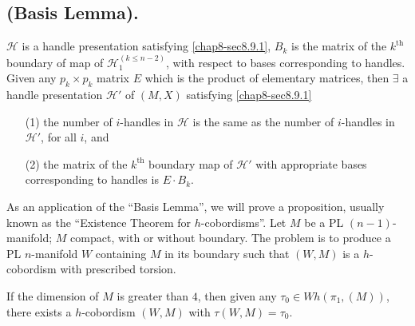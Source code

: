 \subsection{(Basis Lemma).}\label{chap8-sec8.9.2}
$\mathscr{H}$ is a handle presentation satisfying \ref{chap8-sec8.9.1}, $B_{k}$ is the matrix of the $k^{\text{th}}$ boundary of map of $\mathscr{H}_{1}^{(k\leq n-2)}$, with respect to bases corresponding to handles. Given any $p_{k}\times p_{k}$ matrix $E$ which is the product of elementary matrices, then $\exists$ a handle presentation $\mathscr{H}'$ of $(M,X)$ satisfying \ref{chap8-sec8.9.1}
\begin{itemize}
\item[(1)] the number of $i$-handles in $\mathscr{H}$ is the same as the number of $i$-handles in $\mathscr{H}'$, for all $i$, and

\item[(2)] the matrix of the $k^{\text{th}}$ boundary map of $\mathscr{H}'$ with appropriate bases corresponding to handles is $E\cdot B_{k}$.
\end{itemize}

As an application of the ``Basis Lemma'', we will prove a proposition, usually known as the ``Existence Theorem for $h$-cobordisms''. Let $M$ be a PL $(n-1)$-manifold; $M$ compact, with or without boundary. The problem is to produce a PL $n$-manifold $W$ containing $M$ in its boundary such that $(W,M)$ is a $h$-cobordism with prescribed torsion.

\setcounter{proposition}{2}
\begin{proposition}\label{chap8-prop8.9.3}
If the dimension of $M$ is greater than $4$, then given any $\tau_{0}\in Wh(\pi_{1},(M))$, there exists a $h$-cobordism $(W,M)$ with $\tau(W,M)=\tau_{0}$.
\end{proposition}

